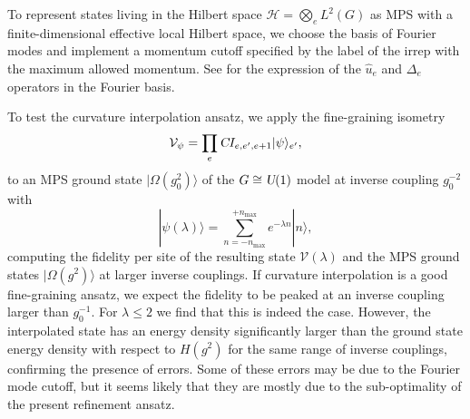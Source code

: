 \documentclass[twocolumn,lengthcheck,superscriptaddress]{revtex4-1}
\def\uone{\textsl{U}(1)}
\theoremstyle{definition}
\theoremstyle{remark}
\begin{document}
To represent states living in the Hilbert space $\mathcal{H} = \bigotimes_e L^2(G)$ as MPS with a finite-dimensional effective local Hilbert space, we choose the basis of Fourier modes and implement a momentum cutoff specified by the label of the irrep with the maximum allowed momentum. See \cite{milsted:2015a} for the expression of the $\widehat{u}_e$ and $\Delta_e$ operators in the Fourier basis.

To test the curvature interpolation ansatz, we apply the fine-graining isometry 
\begin{equation} \label{eq:interp_R}
  \mathcal{V}_\psi = \prod_{e} \textsl{C}I_{e,e',e + 1} |\psi\rangle_{e'},
\end{equation}
to an MPS ground state $|\Omega(g_0^2)\rangle$ of the $G \cong \uone$ model at inverse coupling $g_0^{-2}$ with 
\begin{equation}
  |\psi(\lambda)\rangle = \sum_{n = -n_{\max}}^{+n_{\max}} e^{-\lambda n} |n\rangle,
\end{equation}
computing the fidelity per site \cite{someone} of the resulting state $\mathcal{V}(\lambda)$ and the MPS ground states $|\Omega(g^2)\rangle$ at larger inverse couplings. If curvature interpolation is a good fine-graining ansatz, we expect the fidelity to be peaked at an inverse coupling larger than $g_0^{-1}$. For $\lambda \le 2$ we find that this is indeed the case. However, the interpolated state has an energy density significantly larger than the ground state energy density with respect to $H(g^{2})$ for the same range of inverse couplings, confirming the presence of errors. Some of these errors may be due to the Fourier mode cutoff, but it seems likely that they are mostly due to the sub-optimality of the present refinement ansatz.
\end{document}
